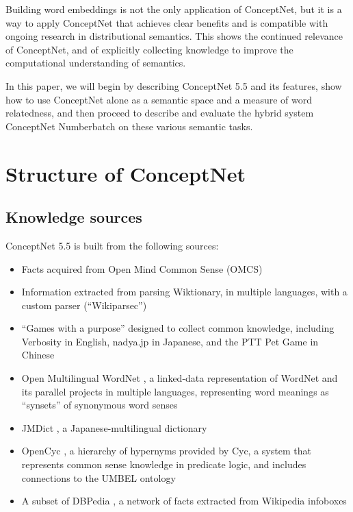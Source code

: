 \documentclass[letterpaper]{article}
\begin{document}
Building word embeddings is not the only application of ConceptNet, but it is a
way to apply ConceptNet that achieves clear benefits and is compatible with
ongoing research in distributional semantics. This shows the continued relevance of
ConceptNet, and of explicitly collecting knowledge to improve the computational
understanding of semantics.

In this paper, we will begin by describing ConceptNet 5.5 and its features,
show how to use ConceptNet alone as a semantic space and a measure of word
relatedness, and then proceed to describe and evaluate the hybrid system
ConceptNet Numberbatch on these various semantic tasks.

\section{Structure of ConceptNet}\label{structure-of-conceptnet}


\subsection{Knowledge sources}\label{knowledge-sources}

ConceptNet 5.5 is built from the following sources:

\begin{itemize}
\item
  Facts acquired from Open Mind Common Sense (OMCS) \cite{singh2002omcs}
\item
  Information extracted from parsing Wiktionary, in multiple languages,
  with a custom parser (``Wikiparsec'')
\item
  ``Games with a purpose'' designed to collect common knowledge,
  including Verbosity \cite{vonahn2006verbosity} in English, nadya.jp
  \cite{nakahara2011nadya} in Japanese, and the PTT Pet Game
  \cite{kuo2009petgame} in Chinese
\item
  Open Multilingual WordNet \cite{bond2013linking}, a linked-data
  representation of WordNet \cite{miller1998wordnet} and its parallel
  projects in multiple languages, representing word meanings as
  ``synsets'' of synonymous word senses
\item
  JMDict \cite{breen2004jmdict}, a Japanese-multilingual dictionary
\item
  OpenCyc \cite{matuszek2006cyc}, a hierarchy of hypernyms provided by
  Cyc, a system that represents common sense knowledge in predicate
  logic, and includes connections to the UMBEL ontology
  \cite{bergman2008umbel}
\item
  A subset of DBPedia \cite{auer2007dbpedia}, a network of facts
  extracted from Wikipedia infoboxes
\end{itemize}
\end{document}
